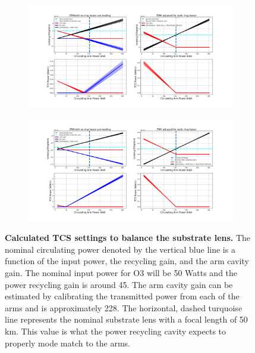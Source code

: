 	\begin{figure}[!]
		\centering
		\begin{subfigure}[b]{1.0\textwidth}
			\centering
			\includegraphics[width=\textwidth]{../Figures/ITMX_TCS_Settings.png}
			\label{fig:TCS_ITMX}
		\end{subfigure}
		\hfill
		\begin{subfigure}[b]{1.0\textwidth}
			\centering
			\includegraphics[width=\textwidth]{../Figures/ITMY_TCS_Settings.png}
			\label{fig:TCS_ITMY}
		\end{subfigure}
		\caption[Calculated TCS settings to balance the substrate lens.]{
			\textbf{Calculated TCS settings to balance the substrate lens.}  The nominal circulating power denoted by the vertical blue line is a function of the input power, the recycling gain, and the arm cavity gain.  The nominal input power for O3 will be 50 Watts and the power recycling gain is around 45.  The arm cavity gain can be estimated by calibrating the transmitted power from each of the arms and is approximately 228.  The horizontal, dashed turquoise line represents the nominal substrate lens with a focal length of 50 km.  This value is what the power recycling cavity expects to properly mode match to the arms. 
		}
		\label{fig:TCS_ITMs}
	\end{figure}
	
